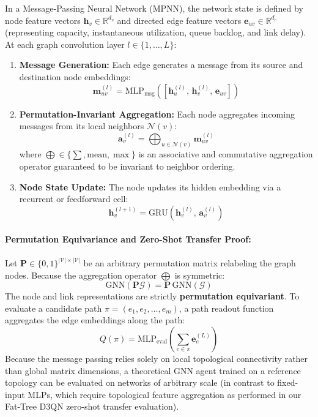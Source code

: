 \documentclass[12pt,a4paper,oneside]{report}
\begin{document}
In a Message-Passing Neural Network (MPNN), the network state is defined by node feature vectors $\mathbf{h}_v \in \mathbb{R}^{d_v}$ and directed edge feature vectors $\mathbf{e}_{uv} \in \mathbb{R}^{d_e}$ (representing capacity, instantaneous utilization, queue backlog, and link delay).
At each graph convolution layer $l \in \{1, \dots, L\}$:
\begin{enumerate}
    \item \textbf{Message Generation:} Each edge generates a message from its source and destination node embeddings:
    \begin{equation}
    \mathbf{m}_{uv}^{(l)} = \text{MLP}_{\text{msg}}\left( \left[ \mathbf{h}_u^{(l)}, \, \mathbf{h}_v^{(l)}, \, \mathbf{e}_{uv} \right] \right)
    \end{equation}
    \item \textbf{Permutation-Invariant Aggregation:} Each node aggregates incoming messages from its local neighbors $\mathcal{N}(v)$:
    \begin{equation}
    \mathbf{a}_v^{(l)} = \bigoplus_{u \in \mathcal{N}(v)} \mathbf{m}_{uv}^{(l)}
    \end{equation}
    where $\bigoplus \in \{\sum, \text{mean}, \max\}$ is an associative and commutative aggregation operator guaranteed to be invariant to neighbor ordering.
    \item \textbf{Node State Update:} The node updates its hidden embedding via a recurrent or feedforward cell:
    \begin{equation}
    \mathbf{h}_v^{(l+1)} = \text{GRU}\left( \mathbf{h}_v^{(l)}, \, \mathbf{a}_v^{(l)} \right)
    \end{equation}
\end{enumerate}

\paragraph{Permutation Equivariance and Zero-Shot Transfer Proof:}
Let $\mathbf{P} \in \{0, 1\}^{|\mathcal{V}| \times |\mathcal{V}|}$ be an arbitrary permutation matrix relabeling the graph nodes. Because the aggregation operator $\bigoplus$ is symmetric:
\begin{equation}
\text{GNN}(\mathbf{P} \mathcal{G}) = \mathbf{P} \, \text{GNN}(\mathcal{G})
\end{equation}
The node and link representations are strictly \textbf{permutation equivariant}. To evaluate a candidate path $\pi = (e_1, e_2, \dots, e_m)$, a path readout function aggregates the edge embeddings along the path:
\begin{equation}
Q(\pi) = \text{MLP}_{\text{eval}}\left( \sum_{e \in \pi} \mathbf{e}_{e}^{(L)} \right)
\end{equation}
Because the message passing relies solely on local topological connectivity rather than global matrix dimensions, a theoretical GNN agent trained on a reference topology can be evaluated on networks of arbitrary scale (in contrast to fixed-input MLPs, which require topological feature aggregation as performed in our Fat-Tree D3QN zero-shot transfer evaluation).
\end{document}
